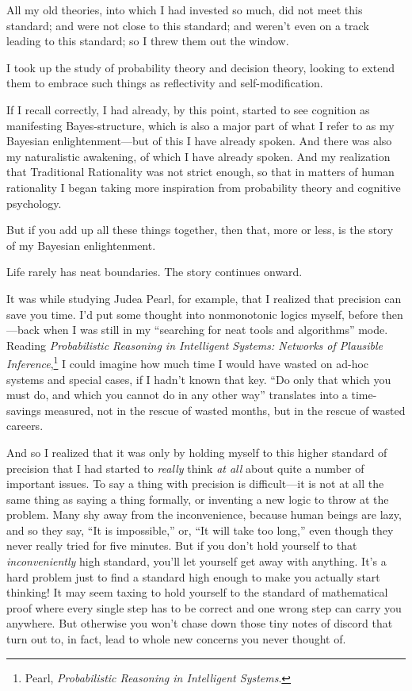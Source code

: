 {
 All my old theories, into which I had invested so much, did not
meet this standard; and were not close to this standard; and
weren't even on a track leading to this standard; so I
threw them out the window.}

{
 I took up the study of probability theory and decision theory,
looking to extend them to embrace such things as reflectivity and
self-modification.}

{
 If I recall correctly, I had already, by this point, started to
see cognition as manifesting Bayes-structure, which is also a major
part of what I refer to as my Bayesian enlightenment---but of this I
have already spoken. And there was also my naturalistic awakening, of
which I have already spoken. And my realization that Traditional
Rationality was not strict enough, so that in matters of human
rationality I began taking more inspiration from probability theory and
cognitive psychology.}

{
 But if you add up all these things together, then that, more or
less, is the story of my Bayesian enlightenment.}

{
 Life rarely has neat boundaries. The story continues onward.}

{
 It was while studying Judea Pearl, for example, that I realized
that precision can save you time. I'd put some thought
into nonmonotonic logics myself, before then---back when I was still in
my ``searching for neat tools and
algorithms'' mode. Reading \textit{Probabilistic
Reasoning in Intelligent Systems: Networks of Plausible
Inference},\footnote{Pearl, \textit{Probabilistic Reasoning in Intelligent
Systems}.} I could imagine how much time I would
have wasted on ad-hoc systems and special cases, if I
hadn't known that key. ``Do only that
which you must do, and which you cannot do in any other
way'' translates into a time-savings measured, not in
the rescue of wasted months, but in the rescue of wasted careers.}

{
 And so I realized that it was only by holding myself to this
higher standard of precision that I had started to \textit{really}
think \textit{at all} about quite a number of important issues. To say
a thing with precision is difficult---it is not at all the same thing
as saying a thing formally, or inventing a new logic to throw at the
problem. Many shy away from the inconvenience, because human beings are
lazy, and so they say, ``It is
impossible,'' or, ``It will take too
long,'' even though they never really tried for five
minutes. But if you don't hold yourself to that
\textit{inconveniently} high standard, you'll let
yourself get away with anything. It's a hard problem
just to find a standard high enough to make you actually start
thinking! It may seem taxing to hold yourself to the standard of
mathematical proof where every single step has to be correct and one
wrong step can carry you anywhere. But otherwise you
won't chase down those tiny notes of discord that turn
out to, in fact, lead to whole new concerns you never thought of.}

